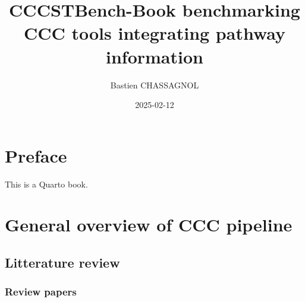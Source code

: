 \documentclass[
  letterpaper,
]{book}
\title{CCCSTBench-Book benchmarking CCC tools integrating pathway
information}
\author{Bastien CHASSAGNOL}
\date{2025-02-12}
\renewcommand*\contentsname{Table of contents}
\newcommand\contentsname{Table of contents}
\begin{document}
\frontmatter
\maketitle

\renewcommand*\contentsname{Table of contents}
{
\setcounter{tocdepth}{2}
\tableofcontents
}
\listoffigures
\listoftables

\mainmatter
{}

\chapter*{Preface}\label{preface}


This is a Quarto book.


\chapter{General overview of CCC
pipeline}\label{general-overview-of-ccc-pipeline}

\section{Litterature review}\label{litterature-review}

\subsection{Review papers}\label{review-papers}
\end{document}

